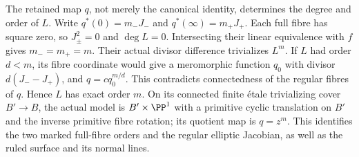 The retained map $q$, not merely the canonical identity,
determines the degree and order of $L$. Write
$q^*(0)=m_-J_-$ and $q^*(\infty)=m_+J_+$.
Each full fibre has square zero, so $J_\pm^2=0$ and
$\deg L=0$. Intersecting their linear equivalence with
$f$ gives $m_-=m_+=m$. Their actual divisor difference
trivializes $L^m$. If $L$ had order $d<m$, its fibre
coordinate would give a meromorphic function $q_0$
with divisor $d(J_--J_+)$, and
$q=cq_0^{m/d}$. This contradicts connectedness of the
regular fibres of $q$. Hence $L$ has exact order $m$.
On its connected finite \'{e}tale trivializing cover
$B'\to B$, the actual model is $B'\times\PP^1$ with
a primitive cyclic translation on $B'$ and the inverse
primitive fibre rotation; its quotient map is $q=z^m$.
This identifies the two marked full-fibre orders and
the regular elliptic Jacobian, as well as the ruled
surface and its normal lines.
